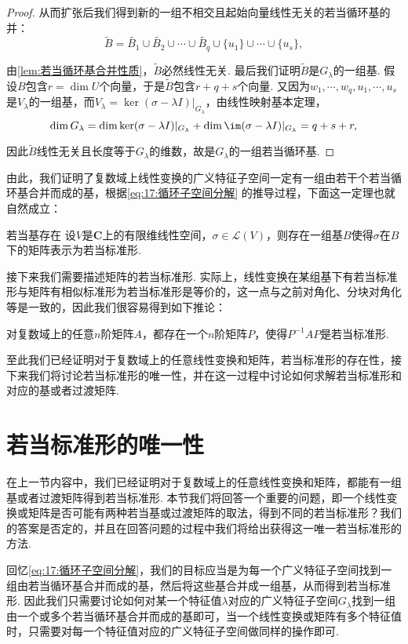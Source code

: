 \begin{proof}
    从而扩张后我们得到新的一组不相交且起始向量线性无关的若当循环基的并：
    \[\tilde{B}=\tilde{B_1}\cup\tilde{B_2}\cup\cdots\cup\tilde{B_q}\cup\{u_1\}\cup\cdots\cup\{u_s\},\]

    由\autoref{lem:若当循环基合并性质}，$\tilde{B}$必然线性无关. 最后我们证明$\tilde{B}$是$G_\lambda$的一组基. 假设$B$包含$r=\dim U$个向量，于是$\tilde{B}$包含$r+q+s$个向量. 又因为$w_1,\cdots,w_q,u_1,\cdots,u_s$是$V_\lambda$的一组基，而$V_\lambda=\ker(\sigma-\lambda I)\vert_{G_\lambda}$，由线性映射基本定理，
    \[\dim G_\lambda=\dim\ker(\sigma-\lambda I)\vert_{G_\lambda}+\dim\im(\sigma-\lambda I)\vert_{G_\lambda}=q+s+r,\]

    因此$\tilde{B}$线性无关且长度等于$G_\lambda$的维数，故是$G_\lambda$的一组若当循环基.
\end{proof}

由此，我们证明了复数域上线性变换的广义特征子空间一定有一组由若干个若当循环基合并而成的基，根据\autoref{eq:17:循环子空间分解} 的推导过程，下面这一定理也就自然成立：
\begin{corollary}{}{若当基存在}
    设$V$是$\mathbf{C}$上的有限维线性空间，$\sigma\in\mathcal{L}(V)$，则存在一组基$B$使得$\sigma$在$B$下的矩阵表示为若当标准形.
\end{corollary}

接下来我们需要描述矩阵的若当标准形. 实际上，线性变换在某组基下有若当标准形与矩阵有相似标准形为若当标准形是等价的，这一点与之前对角化、分块对角化等是一致的，因此我们很容易得到如下推论：
\begin{corollary}{}{}
    对复数域上的任意$n$阶矩阵$A$，都存在一个$n$阶矩阵$P$，使得$P^{-1}AP$是若当标准形.
\end{corollary}

至此我们已经证明对于复数域上的任意线性变换和矩阵，若当标准形的存在性，接下来我们将讨论若当标准形的唯一性，并在这一过程中讨论如何求解若当标准形和对应的基或者过渡矩阵.

\section{若当标准形的唯一性}

在上一节内容中，我们已经证明对于复数域上的任意线性变换和矩阵，都能有一组基或者过渡矩阵得到若当标准形. 本节我们将回答一个重要的问题，即一个线性变换或矩阵是否可能有两种若当基或过渡矩阵的取法，得到不同的若当标准形？我们的答案是否定的，并且在回答问题的过程中我们将给出获得这一唯一若当标准形的方法.

回忆\autoref{eq:17:循环子空间分解}，我们的目标应当是为每一个广义特征子空间找到一组由若当循环基合并而成的基，然后将这些基合并成一组基，从而得到若当标准形. 因此我们只需要讨论如何对某一个特征值$\lambda$对应的广义特征子空间$G_\lambda$找到一组由一个或多个若当循环基合并而成的基即可，当一个线性变换或矩阵有多个特征值时，只需要对每一个特征值对应的广义特征子空间做同样的操作即可.

